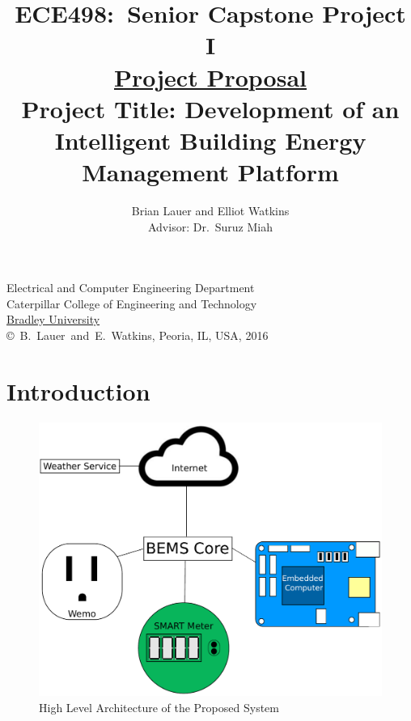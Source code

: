 \documentclass[letterpaper,12pt]{article}   %
\title{ECE498:~Senior Capstone Project I\\\textbf{\underline{Project Proposal}}\\
\vspace{0.5in}
Project Title: Development of an Intelligent Building Energy Management Platform}
\author{Brian Lauer and Elliot Watkins\\ Advisor: Dr.~Suruz Miah
}
\date{}  %
\begin{document}
\begin{titlepage}
 \maketitle

\vspace*{4.0cm}
\begin{center}
\normalsize
Electrical and Computer Engineering Department\\
Caterpillar College of Engineering and Technology\\
\href{http://www.bradley.edu/}{Bradley University}\\

\vspace*{6.0cm}
\copyright~B.~Lauer~and~E.~Watkins, Peoria, IL, USA, 2016\\

\end{center}
\thispagestyle{empty}

\end{titlepage} 
\newpage
\renewcommand{\contentsname}{Table of Contents}
\tableofcontents
\newpage

\section{Introduction} %

\begin{figure}[H]
    \centering
    \includegraphics[scale=0.35]{figs/highLevelArchitecture.pdf}
    \caption{High Level Architecture of the Proposed System}
    \label{fig:highLevelArchitecture}
\end{figure}
\end{document}
